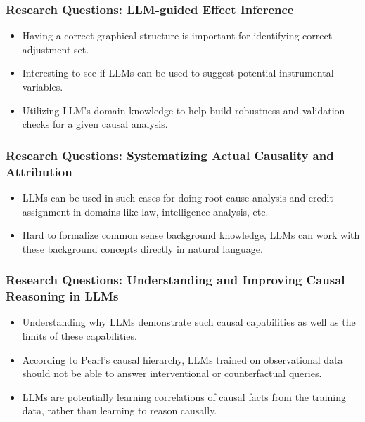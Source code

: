 \documentclass{beamer}
\begin{document}
\begin{frame}
	\frametitle{Research Questions: LLM-guided Effect Inference}
	\begin{itemize}
		\item Having a correct graphical structure is important for identifying
			correct adjustment set.
		\item Interesting to see if LLMs can be used to suggest
			potential instrumental variables.
		\item Utilizing LLM's domain knowledge to help build robustness
			and validation checks for a given causal analysis.
	\end{itemize}
\end{frame}

\begin{frame}
	\frametitle{Research Questions: Systematizing Actual Causality and Attribution}
	\begin{itemize}
		\item LLMs can be used in such cases for doing root cause analysis and
			credit assignment in domains like law, intelligence analysis, etc.
		\item Hard to formalize common sense background knowledge, LLMs can
			work with these background concepts directly in natural
			language.
	\end{itemize}
\end{frame}

\begin{frame}
	\frametitle{Research Questions: Understanding and Improving Causal Reasoning in LLMs}
	\begin{itemize}
		\item Understanding why LLMs demonstrate such causal capabilities
			as well as the limits of these capabilities. 
		\item According to Pearl's causal hierarchy, LLMs trained on
			observational data should not be able to answer
			interventional or counterfactual queries.
		\item LLMs are potentially learning correlations
			of causal facts from the training data, rather than learning
			to reason causally.
	\end{itemize}
\end{frame}
\end{document}
